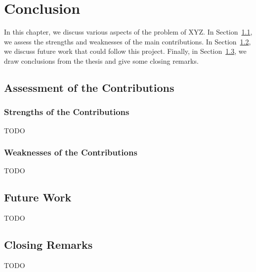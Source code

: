 \chapter{Conclusion}
\label{cha:conclusion}

In this chapter, we discuss various aspects of the problem of XYZ. In Section~\ref{sec:assessment_of_the_contributions}, we assess the strengths and weaknesses of the main contributions. In Section~\ref{sec:future_work}, we discuss future work that could follow this project. Finally, in Section~\ref{sec:closing_remarks}, we draw conclusions from the thesis and give some closing remarks.

\section{Assessment of the Contributions}
\label{sec:assessment_of_the_contributions}

\subsection{Strengths of the Contributions}
\label{sub:strengths_of_the_contributions}

TODO

\subsection{Weaknesses of the Contributions}
\label{sub:weaknesses_of_the_contributions}

TODO

\section{Future Work}
\label{sec:future_work}

TODO

\section{Closing Remarks}
\label{sec:closing_remarks}

TODO

